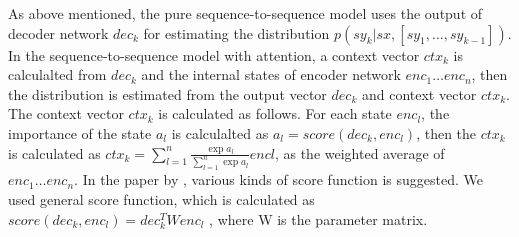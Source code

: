 \documentclass[senior,final,11pt]{iscs-thesis}
\begin{document}
As above mentioned, the pure sequence-to-sequence model uses the output of decoder network $ dec_{k} $ for estimating 
the distribution $ p(sy_k|sx,[sy_1,\dots,sy_{k-1}]) $.
In the sequence-to-sequence model with attention, 
a context vector $ ctx_{k} $ is calculalted from $ dec_{k} $ and the internal states of encoder network $ enc_{1} \dots enc_{n} $, 
then the distribution is estimated from the output vector $ dec_{k} $ and context vector $ ctx_{k} $.
The context vector $ ctx_{k} $ is calculated as follows.
For each state $ enc_{l} $, the importance of the state $ a_{l} $ is calculalted as $ a_{l} = score(dec_{k},enc_{l}) $,
then the $ ctx_{k} $ is calculated as $ ctx_{k} = \sum_{l=1}^{n} \frac{\exp{a_{l}}}{\sum_{l=1}^{n}\exp{a_{l}}} enc{l} $, as the weighted average of $ enc_{1} \dots enc_{n} $.
In the paper by \cite{dot_attention}, various kinds of score function is suggested.
We used general score function, which is calculated as $ score(dec_{k},enc_{l}) = dec_{k}^T W enc_{l} $ ,
where W is the parameter matrix. 






\end{document}
